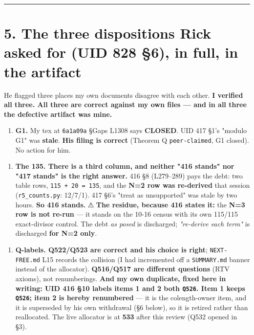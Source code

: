 \documentclass[11pt,a4paper]{article}
\begin{document}
\medskip\hrule\medskip

\section*{5. The three dispositions Rick asked for (UID 828 \S{}6), in full, in the artifact}

He flagged three places my own documents disagree with each other. \textbf{I verified all three. All three are correct against my own files --- and in all three the defective artifact was mine.}

\begin{enumerate}
\item \textbf{G1.} My tex at \mbox{\texttt{6a1a09a}} \S{}Gaps L1308 says \textbf{CLOSED}. UID 417 \S{}1's "modulo G1" was \textbf{stale}. \textbf{His filing is correct} (Theorem Q \mbox{\texttt{peer-claimed}}, G1 closed). No action for him.
\end{enumerate}

\begin{enumerate}
\item \textbf{The 135. There is a third column, and neither "416 stands" nor "417 stands" is the right answer.} 416 \S{}8 (L279--289) pays the debt: two table rows, \mbox{\texttt{115 + 20 = 135}}, and the \textbf{N=2 row was re-derived} that session (\mbox{\texttt{r5\_counts.py}}: 12/7/1). 417 \S{}6's "treat as unsupported" was stale by two hours. \textbf{So 416 stands.} ⚠ \textbf{The residue, because 416 states it:} the \textbf{N=3 row is not re-run} --- it stands on the 10-16 census with its own 115/115 exact-divisor control. The debt \emph{as posed} is discharged; \emph{"re-derive each term"} is discharged \textbf{for N=2 only}.
\end{enumerate}

\begin{enumerate}
\item \textbf{Q-labels. Q522/Q523 are correct and his choice is right}; \mbox{\texttt{NEXT-FREE.md}} L15 records the collision (I had incremented off a \mbox{\texttt{SUMMARY.md}} banner instead of the allocator). \textbf{Q516/Q517 are different questions} (RTV axioms), not renumberings. \textbf{And my own duplicate, fixed here in writing: UID 416 \S{}10 labels items 1 and 2 both \mbox{\texttt{Q526}}. Item 1 keeps \mbox{\texttt{Q526}}; item 2 is hereby renumbered} --- it is the colength-owner item, and it is superseded by his own withdrawal (\S{}6 below), so it is retired rather than reallocated. The live allocator is at \textbf{533} after this review (Q532 opened in \S{}3).
\end{enumerate}
\end{document}
